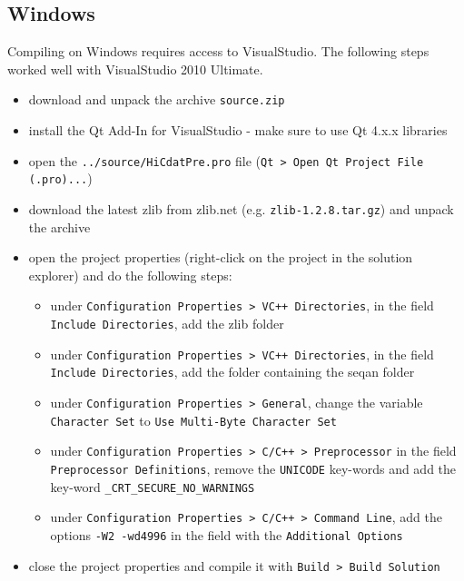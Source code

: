 \documentclass[a4paper,10pt]{article}
\begin{document}
\subsection{Windows}
Compiling on Windows requires access to VisualStudio. The following steps worked well with VisualStudio 2010 Ultimate.
\begin{itemize}
\item download and unpack the archive \texttt{source.zip}
\item install the Qt Add-In for VisualStudio - make sure to use Qt 4.x.x libraries
\item open the \texttt{../source/HiCdatPre.pro} file  (\texttt{Qt > Open Qt Project File (.pro)...})
\item download the latest zlib from zlib.net (e.g. \texttt{zlib-1.2.8.tar.gz}) and unpack the archive
\item open the project properties (right-click on the project in the solution explorer) and do the following steps:
\begin{itemize}
\item under \texttt{Configuration Properties > VC++ Directories}, in the field \texttt{Include Directories}, add the zlib folder
\item under \texttt{Configuration Properties > VC++ Directories}, in the field \texttt{Include Directories}, add the folder containing the seqan folder
\item under \texttt{Configuration Properties > General}, change the variable \texttt{Character Set} to \texttt{Use Multi-Byte Character Set}
\item under \texttt{Configuration Properties > C/C++ > Preprocessor} in the field \texttt{Preprocessor Definitions}, remove the \texttt{UNICODE} key-words and add the key-word \texttt{\_CRT\_SECURE\_NO\_WARNINGS}
\item under \texttt{Configuration Properties > C/C++ > Command Line}, add the options \texttt{-W2 -wd4996} in the field with the \texttt{Additional Options}
\end{itemize}
\item close the project properties and compile it with \texttt{Build > Build Solution}
\end{itemize}
\end{document}
